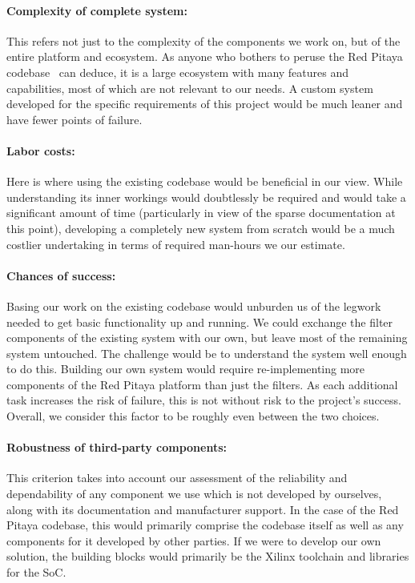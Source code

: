 \paragraph{Complexity  of  complete  system:} This  refers  not  just  to  the
complexity  of  the  components  we  work  on,  but  of  the  entire  platform
and   ecosystem. As   anyone   who   bothers  to   peruse   the   Red   Pitaya
codebase~\cite{pita:github}  can deduce,  it is  a large  ecosystem with  many
features and  capabilities, most  of which  are not  relevant to  our needs. A
custom system developed for the specific requirements of this project would be
much leaner and have fewer points of failure.

\paragraph{Labor  costs:} Here  is where  using  the  existing codebase  would
be  beneficial  in our  view. While  understanding  its inner  workings  would
doubtlessly  be  required  and  would   take  a  significant  amount  of  time
(particularly in view of the sparse documentation at this point), developing a
completely new  system from scratch  would be  a much costlier  undertaking in
terms of required man-hours we our estimate.

\paragraph{Chances of success:} Basing our work on the existing codebase would
unburden  us  of  the  legwork  needed  to  get  basic  functionality  up  and
running. We could exchange  the filter components of the  existing system with
our own, but leave most of the remaining system untouched. The challenge would
be to understand the  system well enough to do this.   Building our own system
would require re-implementing more components  of the Red Pitaya platform than
just the filters. As each additional task  increases the risk of failure, this
is not without risk to the project's success. Overall, we consider this factor
to be roughly even between the two choices.

\paragraph{Robustness  of third-party  components:} This criterion  takes into
account our assessment  of the reliability and dependability  of any component
we use which  is not developed by ourselves, along  with its documentation and
manufacturer  support. In the  case of  the  Red Pitaya  codebase, this  would
primarily  comprise the  codebase  itself as  well as  any  components for  it
developed  by other  parties. If  we were  to develop  our  own solution,  the
building blocks would primarily be the  Xilinx toolchain and libraries for the
SoC.

